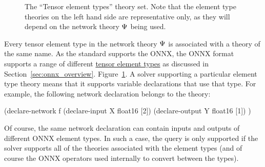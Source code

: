\begin{figure}[h]
\centering
{}
\caption{The ``Tensor element types'' theory set. Note that the element type theories on the left hand side are representative only, as they will depend on the network theory $\Psi$ being used.}
\label{fig:element-type-theories}
\end{figure}

Every tensor element type in the network theory $\Psi$ is associated with a \vnnlib{} theory of the same name.
As the \vnnlib{} standard supports the ONNX, the ONNX format supports a range of different \href{https://onnx.ai/onnx/repo-docs/IR.html#tensor-element-types}{tensor element types} as discussed in Section~\ref{sec:onnx_overview}. Figure~\ref{fig:element-type-theories}. A solver supporting a particular element type theory means that it supports variable declarations that use that type. For example, the following network declaration belongs to the  theory:

\begin{code}[style=lbnf]
(declare-network f
    (declare-input  X float16 [2])
    (declare-output Y float16 [1])
)
\end{code}

Of course, the same network declaration can contain inputs and outputs of different ONNX element types. In such a case, the query is only supported if the solver supports all of the theories associated with the element types (and of course the ONNX operators used internally to convert between the types).

